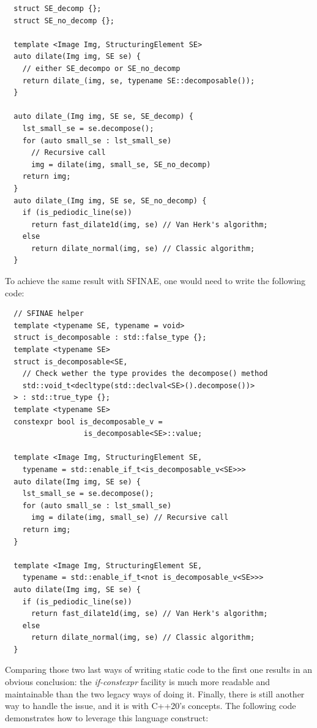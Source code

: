 \begin{verbatim}
  struct SE_decomp {};
  struct SE_no_decomp {};

  template <Image Img, StructuringElement SE>
  auto dilate(Img img, SE se) {
    // either SE_decompo or SE_no_decomp
    return dilate_(img, se, typename SE::decomposable());
  }

  auto dilate_(Img img, SE se, SE_decomp) {
    lst_small_se = se.decompose();
    for (auto small_se : lst_small_se)
      // Recursive call
      img = dilate(img, small_se, SE_no_decomp)
    return img;
  }
  auto dilate_(Img img, SE se, SE_no_decomp) {
    if (is_pediodic_line(se))
      return fast_dilate1d(img, se) // Van Herk's algorithm;
    else
      return dilate_normal(img, se) // Classic algorithm;
  }
\end{verbatim}

To achieve the same result with SFINAE, one would need to write the following code:

\begin{verbatim}
  // SFINAE helper
  template <typename SE, typename = void>
  struct is_decomposable : std::false_type {};
  template <typename SE>
  struct is_decomposable<SE,
    // Check wether the type provides the decompose() method
    std::void_t<decltype(std::declval<SE>().decompose())>
  > : std::true_type {};
  template <typename SE>
  constexpr bool is_decomposable_v =
                  is_decomposable<SE>::value;

  template <Image Img, StructuringElement SE,
    typename = std::enable_if_t<is_decomposable_v<SE>>>
  auto dilate(Img img, SE se) {
    lst_small_se = se.decompose();
    for (auto small_se : lst_small_se)
      img = dilate(img, small_se) // Recursive call
    return img;
  }

  template <Image Img, StructuringElement SE,
    typename = std::enable_if_t<not is_decomposable_v<SE>>>
  auto dilate(Img img, SE se) {
    if (is_pediodic_line(se))
      return fast_dilate1d(img, se) // Van Herk's algorithm;
    else
      return dilate_normal(img, se) // Classic algorithm;
  }
\end{verbatim}

Comparing those two last ways of writing static code to the first one results in an obvious conclusion: the
\emph{if-constexpr} facility is much more readable and maintainable than the two legacy ways of doing it. Finally, there
is still another way to handle the issue, and it is with C++20's concepts. The following code demonstrates how to
leverage this language construct:

